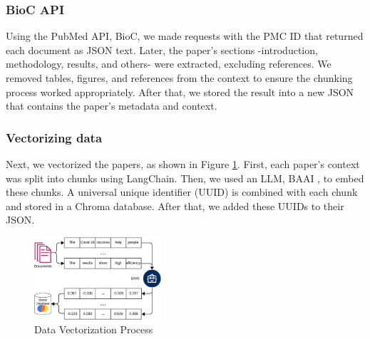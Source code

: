 \subsubsection{BioC API}
Using the PubMed API, BioC, we made requests with the PMC ID that returned each document as JSON text. Later, the paper's sections -introduction, methodology, results, and others- were extracted, excluding references. We removed tables, figures, and references from the context to ensure the chunking process worked appropriately. After that, we stored the result into a new JSON that contains the paper's metadata and context. 

\subsubsection{Vectorizing data}
Next, we vectorized the papers, as shown in Figure \ref{fig:vector}. First, each paper’s context was split into chunks using LangChain. Then, we used an LLM, BAAI \cite{bge_embedding}, to embed these chunks. A universal unique identifier (UUID) is combined with each chunk and stored in a Chroma database. After that, we added these UUIDs to their JSON. 

\begin{figure}[htbp]
	\begin{center}
		\includegraphics[width=0.42\textwidth]{figures/Data_vectorization.jpeg} %
	\end{center}
	\caption{Data Vectorization Process} %
	\label{fig:vector}
\end{figure}


